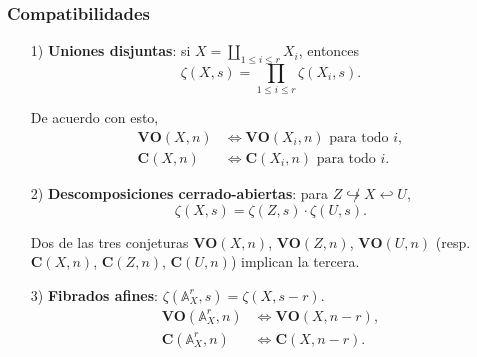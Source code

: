 \documentclass[handout]{beamer}
\renewcommand{\AA}{\mathbb{A}}
\begin{document}
\begin{frame}
  \frametitle{Compatibilidades}

  \begin{enumerate}
  \item[1)] \textbf{Uniones disjuntas}: si
    $X = \coprod_{1 \le i \le r} X_i$, entonces
    \[ \zeta (X,s) = \prod_{1 \le i \le r} \zeta (X_i,s). \]

    De acuerdo con esto,
    \begin{align*}
      \mathbf{VO} (X,n) & \iff \mathbf{VO} (X_i,n)\text{ para todo }i, \\
      \mathbf{C} (X,n) & \iff \mathbf{C} (X_i,n)\text{ para todo }i.
    \end{align*}

  \item[2)] \textbf{Descomposiciones cerrado-abiertas}:
    para $Z \not\hookrightarrow X \hookleftarrow U$,
    \[ \zeta (X,s) = \zeta (Z,s) \cdot \zeta (U,s). \]

    Dos de las tres conjeturas
    $\mathbf{VO} (X,n)$, $\mathbf{VO} (Z,n)$, $\mathbf{VO} (U,n)$
    (resp. $\mathbf{C} (X,n)$, $\mathbf{C} (Z,n)$, $\mathbf{C} (U,n)$)
    implican la tercera.

  \item[3)] \textbf{Fibrados afines}:
    $\zeta (\AA^r_X, s) = \zeta (X, s-r)$.
    \begin{align*}
      \mathbf{VO} (\AA^r_X, n) & \iff \mathbf{VO} (X, n-r), \\
      \mathbf{C} (\AA^r_X, n) & \iff \mathbf{C} (X, n-r).
    \end{align*}
  \end{enumerate}
\end{frame}

\end{document}
